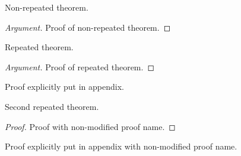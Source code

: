 \documentclass{article}
\begin{document}
\begin{theorem}
  Non-repeated theorem.
\end{theorem}

\begin{proof}[Argument]
  Proof of non-repeated theorem.
\end{proof}

\begin{theoremrep}
  Repeated theorem.
\end{theoremrep}

\begin{proof}[Argument]
  Proof of repeated theorem.
\end{proof}

\begin{appendixproof}[Argument]
  Proof explicitly put in appendix.
\end{appendixproof}

\begin{theoremrep}
  Second repeated theorem.
\end{theoremrep}

\begin{proof}
Proof with non-modified proof name.
\end{proof}

\begin{appendixproof}
Proof explicitly put in appendix with non-modified proof name.
\end{appendixproof}
\end{document}
